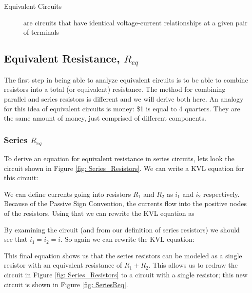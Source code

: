 \documentclass{handout}
\begin{document}
\begin{description}
\item [Equivalent Circuits] are circuits that have identical voltage-current relationships at a given pair of terminals
\end{description}

\subsection{Equivalent Resistance, $R_{eq}$}
The first step in being able to analyze equivalent circuits is to be able to combine resistors into a total (or equivalent) resistance.  The method for combining parallel and series resistors is different and we will derive both here. An analogy for this idea of equivalent circuits is money: \$1 is equal to 4 quarters. They are the same amount of money, just comprised of different components.

\subsubsection{Series $R_{eq}$}
To derive an equation for equivalent resistance in series circuits, lets look the circuit shown in Figure \ref{fig: Series_Resistors}. We can write a KVL equation for this circuit:


We can define currents going into resistors $R_1$ and $R_2$ as $i_1$ and $i_2$ respectively.  Because of the Passive Sign Convention, the currents flow into the positive nodes of the resistors. Using that we can rewrite the KVL equation as


By examining the circuit (and from our definition of series resistors) we should see that $i_1=i_2=i$.  So again we can rewrite the KVL equation:


This final equation shows us that the series resistors can be modeled as a single resistor with an equivalent resistance of $R_1+R_2$.  This allows us to redraw the circuit in Figure \ref{fig: Series_Resistors} to a circuit with a single resistor; this new circuit is shown in Figure \ref{fig: SeriesReq}.
\end{document}
